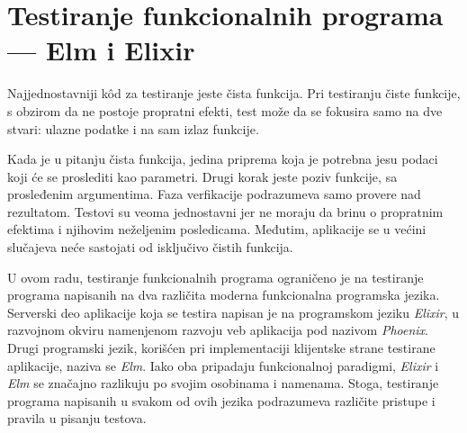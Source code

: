 \documentclass[12pt,oneside]{memoir}
\begin{document}
\section{Testiranje funkcionalnih programa --- Elm i Elixir}
\label{sec:elmopste}

\par Najjednostavniji k\^{o}d za testiranje jeste čista funkcija. Pri testiranju čiste funkcije, s obzirom da ne postoje propratni efekti, test može da se fokusira samo na dve stvari: ulazne podatke i na sam izlaz funkcije. 
\par Kada je u pitanju čista funkcija, jedina priprema koja je potrebna jesu podaci koji će se proslediti kao parametri. Drugi korak jeste poziv funkcije, sa prosleđenim argumentima. Faza verfikacije podrazumeva samo provere nad rezultatom. Testovi su veoma jednostavni jer ne moraju da brinu o propratnim efektima i njihovim neželjenim posledicama. Međutim, aplikacije se u većini slučajeva neće sastojati od isključivo čistih funkcija.
\par U ovom radu, testiranje funkcionalnih programa ograničeno je na testiranje programa napisanih na dva različita moderna funkcionalna programska jezika. Serverski deo aplikacije koja se testira napisan je na programskom jeziku \emph{Elixir}, u razvojnom okviru namenjenom razvoju veb aplikacija pod nazivom \emph{Phoenix}. Drugi programski jezik, korišćen pri implementaciji klijentske strane testirane aplikacije, naziva se \emph{Elm}. Iako oba pripadaju funkcionalnoj paradigmi, \emph{Elixir} i \emph{Elm} se značajno razlikuju po svojim osobinama i namenama. Stoga, testiranje programa napisanih u svakom od ovih jezika podrazumeva različite pristupe i pravila u pisanju testova.   
\end{document}
